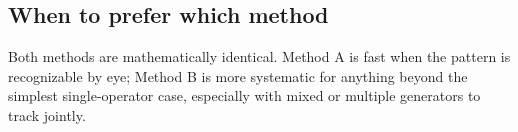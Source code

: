 \documentclass[../../main.tex]{subfiles}
\begin{document}





\subsection{When to prefer which method}
Both methods are mathematically identical. Method A is fast when the pattern is
recognizable by eye; Method B is more systematic for anything beyond the simplest
single-operator case, especially with mixed or multiple generators to track jointly.
\end{document}
